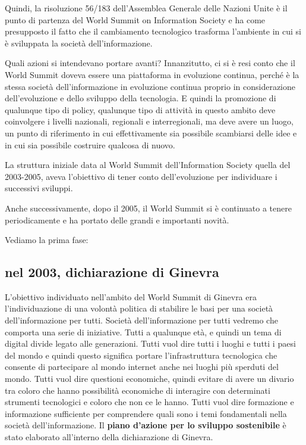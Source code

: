 Quindi, la risoluzione 56/183 dell'Assemblea Generale delle Nazioni Unite è il punto di partenza del World Summit on Information Society e ha come presupposto il fatto che il cambiamento tecnologico trasforma l'ambiente in cui si è sviluppata la società dell'informazione.\par
Quali azioni si intendevano portare avanti? Innanzitutto, ci si è resi conto che il World Summit doveva essere una piattaforma in evoluzione continua, perché è la stessa società dell'informazione in evoluzione continua proprio in considerazione dell'evoluzione e dello sviluppo della tecnologia. E quindi la promozione di qualunque tipo di policy, qualunque tipo di attività in questo ambito deve coinvolgere i livelli nazionali, regionali e interregionali, ma deve avere un luogo, un punto di riferimento in cui effettivamente sia possibile scambiarsi delle idee e in cui sia possibile costruire qualcosa di nuovo. \par
La struttura iniziale data al World Summit dell'Information Society quella del 2003-2005, aveva l'obiettivo di tener conto dell'evoluzione per individuare i successivi sviluppi.\par
Anche successivamente, dopo il 2005, il World Summit si è continuato a tenere periodicamente e ha portato delle grandi e importanti novità. \par

Vediamo la prima fase:
\subsection{nel 2003, dichiarazione di Ginevra}
L'obiettivo individuato nell'ambito del World Summit di Ginevra era l'individuazione di una volontà politica di stabilire le basi per una società dell'informazione per tutti. Società dell'informazione per tutti vedremo che comporta una serie di iniziative. Tutti a qualunque età, e quindi un tema di digital divide legato alle generazioni. Tutti vuol dire tutti i luoghi e tutti i paesi del mondo e quindi questo significa portare l'infrastruttura tecnologica che consente di partecipare al mondo internet anche nei luoghi più sperduti del mondo. Tutti vuol dire questioni economiche, quindi evitare di avere un divario tra coloro che hanno possibilità economiche di interagire con determinati strumenti tecnologici e coloro che non ce le hanno. Tutti vuol dire formazione e informazione sufficiente per comprendere quali sono i temi fondamentali nella società dell'informazione.
Il \textbf{piano d'azione per lo sviluppo sostenibile} è stato elaborato all'interno della dichiarazione di Ginevra. \par

